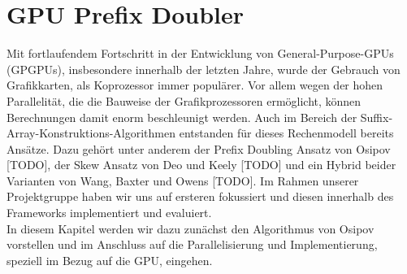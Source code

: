 \section{GPU Prefix Doubler}
\label{algorithm:gpuprefix}

Mit fortlaufendem Fortschritt in der Entwicklung von General-Purpose-GPUs (GPGPUs), insbesondere innerhalb der letzten Jahre, wurde der Gebrauch von Grafikkarten, als Koprozessor immer populärer. Vor allem wegen der hohen Parallelität, die die Bauweise der Grafikprozessoren ermöglicht, können Berechnungen damit enorm beschleunigt werden. Auch im Bereich der Suffix-Array-Konstruktions-Algorithmen entstanden für dieses Rechenmodell bereits Ansätze. Dazu gehört unter anderem der Prefix Doubling Ansatz von Osipov [TODO], der Skew Ansatz von Deo und Keely [TODO] und ein Hybrid beider Varianten von Wang, Baxter und Owens [TODO]. Im Rahmen unserer Projektgruppe haben wir uns auf ersteren fokussiert und diesen innerhalb des Frameworks implementiert und evaluiert.\\
In diesem Kapitel werden wir dazu zunächst den Algorithmus von Osipov vorstellen und im Anschluss auf die Parallelisierung und Implementierung, speziell im Bezug auf die GPU, eingehen.
